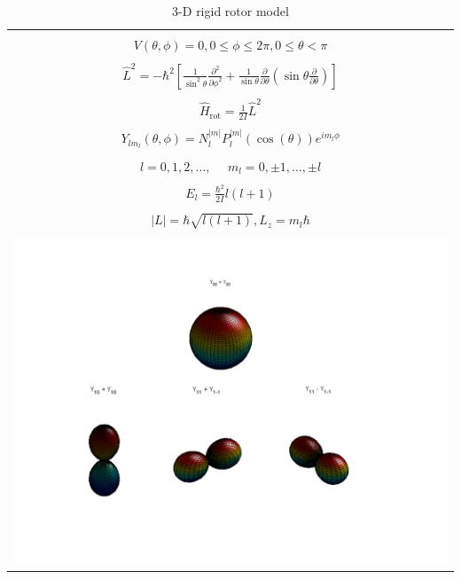 \message{ !name(Outline.tex)}\documentclass[11pt]{article}
\begin{document}
\begin{outline}
\begin{outline}
  \end{outline}
\begin{table}[tbh]
   \begin{center}
   \caption{3-D rigid rotor model}
    \label{3-D Rigid rotor}
\begin{tabular}[h]{|c|}
\hline
 \\
$\displaystyle       V(\theta,\phi) = 0, 0 \leq \phi \leq 2\pi, 0 \leq \theta <
\pi$ \\
 \\
$\displaystyle     \hat L^2 = -\hbar^2 \left [
  \frac{1}{\sin^2\theta}\frac{\partial^2}{\partial \phi^2}+\frac{1}{\sin
    \theta}\frac{\partial}{\partial \theta}\left ( \sin \theta
    \frac{\partial}{\partial \theta}\right ) \right ] $ \\
\\
$\displaystyle \hat H_\text{rot} = \frac{1}{2 I} \hat L^2$ \\
\\
$\displaystyle     Y_{lm_l}(\theta,\phi)=N_l^{|m|}P_l^{|m|}(\cos(\theta))e^{im_l\phi}$ \\
\\
$\displaystyle l = 0, 1, 2, \ldots, \ \ \ \ \ \ m_l = 0,\pm 1, \ldots, \pm l$
\\
\\
$\displaystyle     E_{l}=\frac{\hbar^2}{2 I}l(l+1)$ \\
 \\
$\displaystyle |L| = \hbar \sqrt{l(l+1)}, L_z = m_l \hbar $ \\
\\
     \includegraphics[scale=0.4]{Images/3D_rotor} \\       
\hline
\end{tabular}
 \end{center}
\end{table}


\end{outline}
\end{document}
